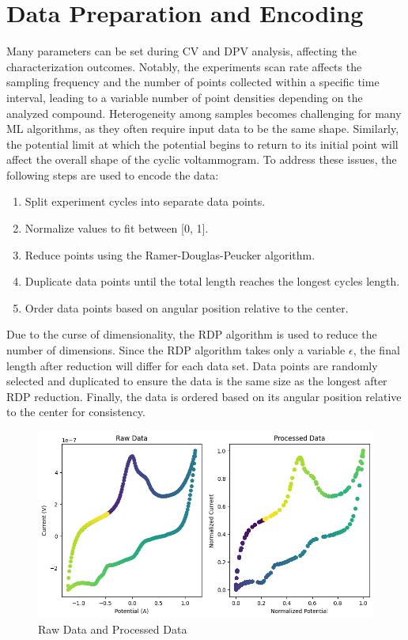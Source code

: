 \section{Data Preparation and Encoding}
Many parameters can be set during CV and DPV analysis, affecting the characterization outcomes. Notably, the experiment\textquotesingle s scan rate affects the sampling frequency and the number of points collected within a specific time interval, leading to a variable number of point densities depending on the analyzed compound. Heterogeneity among samples becomes challenging for many ML algorithms, as they often require input data to be the same shape. Similarly, the potential limit at which the potential begins to return to its initial point will affect the overall shape of the cyclic voltammogram. To address these issues, the following steps are used to encode the data:
\begin{enumerate}
    \item Split experiment cycles into separate data points.
    \item Normalize values to fit between [0, 1].
    \item Reduce points using the Ramer-Douglas-Peucker algorithm.
    \item Duplicate data points until the total length reaches the longest cycle\textquotesingle s length.
    \item Order data points based on angular position relative to the center.
\end{enumerate}
Due to the curse of dimensionality, the RDP algorithm is used to reduce the number of dimensions. Since the RDP algorithm takes only a variable $\epsilon$, the final length after reduction will differ for each data set. Data points are randomly selected and duplicated to ensure the data is the same size as the longest after RDP reduction. Finally, the data is ordered based on its angular position relative to the center for consistency.
\begin{figure}[!h]
  \centering
    \includegraphics[width=1.0\textwidth]{figures/encoding.png}
    \caption{Raw Data and Processed Data}
    \label{encoding}
\end{figure}
